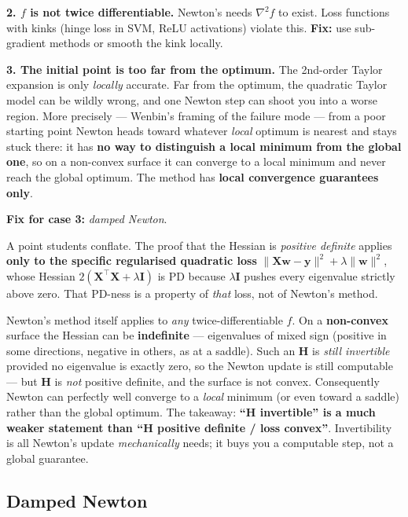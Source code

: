\documentclass[11pt, a4paper]{article}
\begin{document}
\textbf{2. $f$ is not twice differentiable.} Newton's needs $\nabla^2 f$ to exist. Loss functions with kinks (hinge loss in SVM, ReLU activations) violate this. \textbf{Fix:} use sub-gradient methods or smooth the kink locally.

\textbf{3. The initial point is too far from the optimum.} The 2nd-order Taylor expansion is only \emph{locally} accurate. Far from the optimum, the quadratic Taylor model can be wildly wrong, and one Newton step can shoot you into a worse region. More precisely — Wenbin's framing of the failure mode — from a poor starting point Newton heads toward whatever \emph{local} optimum is nearest and stays stuck there: it has \textbf{no way to distinguish a local minimum from the global one}, so on a non-convex surface it can converge to a local minimum and never reach the global optimum. The method has \textbf{local convergence guarantees only}.

\textbf{Fix for case 3:} \emph{damped Newton}.

\begin{notebox}
A point students conflate. The proof that the Hessian is \emph{positive definite} applies \textbf{only to the specific regularised quadratic loss} $\|\mathbf{X}\mathbf{w}-\mathbf{y}\|^2 + \lambda\|\mathbf{w}\|^2$, whose Hessian $2(\mathbf{X}^\top\mathbf{X}+\lambda\mathbf{I})$ is PD because $\lambda\mathbf{I}$ pushes every eigenvalue strictly above zero. That PD-ness is a property of \emph{that} loss, not of Newton's method.

Newton's method itself applies to \emph{any} twice-differentiable $f$. On a \textbf{non-convex} surface the Hessian can be \textbf{indefinite} — eigenvalues of mixed sign (positive in some directions, negative in others, as at a saddle). Such an $\mathbf{H}$ is \emph{still invertible} provided no eigenvalue is exactly zero, so the Newton update is still computable — but $\mathbf{H}$ is \emph{not} positive definite, and the surface is not convex. Consequently Newton can perfectly well converge to a \emph{local} minimum (or even toward a saddle) rather than the global optimum. The takeaway: \textbf{``$\mathbf{H}$ invertible'' is a much weaker statement than ``$\mathbf{H}$ positive definite / loss convex''}. Invertibility is all Newton's update \emph{mechanically} needs; it buys you a computable step, not a global guarantee.
\end{notebox}

\subsection{Damped Newton}
\end{document}
